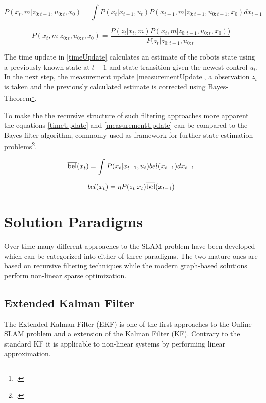 \begin{equation}\label{timeUpdate}
	P(x_{t}, m | z_{0:t-1}, u_{0:t}, x_{0}) = \int P(x_{t} | x_{t-1}, u_{t}) P(x_{t-1}, m | z_{0:t-1}, u_{0:t-1}, x_{0}) dx_{t-1}
\end{equation}


\begin{equation}\label{measurementUpdate}
	P(x_{t}, m | z_{0:t}, u_{0:t}, x_{0}) = \frac{P(z_{t} | x_{t}, m) P(x_{t}, m | z_{0:t-1}, u_{0:t}, x_{0}))}{P(z_{t} | z_{0:t-1}, u_{0:t}}
\end{equation}

The time update in \ref{timeUpdate} calculates an estimate of the robots state using a previously known state at $ t - 1 $ and state-transition given the newest control $ u_{t} $.
In the next step, the measurement update \ref{measurementUpdate}, a observation $z_{t} $ is taken and the previously calculated estimate is corrected using Bayes-Theorem\footcite{durrantSlam2006}. 

To make the the recursive structure of such filtering approaches more apparent the equations \ref{timeUpdate} and \ref{measurementUpdate} can be compared to the Bayes filter algorithm, commonly used as framework for further state-estimation problems\footcite[Page 23]{thrun2002probabilisticRobotics}.

\begin{equation}\label{timeUpdateBayes}
	\overline{\rm bel}(x_{t}) = \int P(x_{t} | x_{t-1}, u_{t})  bel(x_{t-1}) dx_{t-1}
\end{equation}


\begin{equation}\label{measurementUpdateBayes}
	bel(x_{t}) = \eta  P(z_{t} | x_{t})  \overline{\rm bel}(x_{t-1})
\end{equation}

\section{Solution Paradigms} 
Over time many different approaches to the SLAM problem have been developed which can be categorized into either of three paradigms. The two mature ones are based on recursive filtering techniques while the modern graph-based solutions perform non-linear sparse optimization.

\subsection{Extended Kalman Filter}
The Extended Kalman Filter (EKF) is one of the first approaches to the Online-SLAM problem and a extension of the Kalman Filter (KF). Contrary to the standard KF it is applicable to non-linear systems by performing linear approximation.

